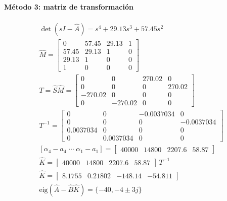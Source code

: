 \documentclass[11pt]{article}
\begin{document}
\paragraph{Método 3: matriz de transformación}
\begin{gather*}
\det(sI-\hat{A})=s^{4} + 29.13s^{3} + 57.45s^{2}\\
\hat{M}=\begin{bmatrix}0 & 57.45 & 29.13 & 1 \\ 57.45 & 29.13 & 1 & 0 \\ 29.13 & 1 & 0 & 0 \\ 1 & 0 & 0 & 0\end{bmatrix}\\
T=\hat{S}\hat{M}=\begin{bmatrix}0 & 0 & 270.02 & 0 \\ 0 & 0 & 0 & 270.02 \\ -270.02 & 0 & 0 & 0 \\ 0 & -270.02 & 0 & 0\end{bmatrix}\\
T^{-1}=\begin{bmatrix}0 & 0 & -0.0037034 & 0 \\ 0 & 0 & 0 & -0.0037034 \\ 0.0037034 & 0 & 0 & 0 \\ 0 & 0.0037034 & 0 & 0\end{bmatrix}\\
[\alpha_4-a_4\;\cdots\;\alpha_1-a_1]=\begin{bmatrix}40000 & 14800 & 2207.6 & 58.87\end{bmatrix}\\
\hat{K}=\begin{bmatrix}40000 & 14800 & 2207.6 & 58.87\end{bmatrix}\,T^{-1}\\
\hat{K}=\begin{bmatrix}8.1755 & 0.21802 & -148.14 & -54.811\end{bmatrix}\\
\text{eig}(\hat{A}-\hat{B}\hat{K})=\{-40, -4\pm3j\}
\end{gather*}
\end{document}
